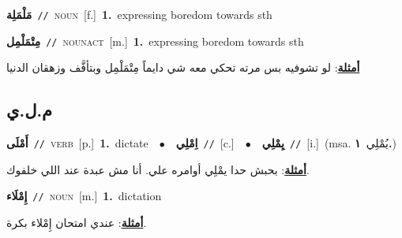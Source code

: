 \documentclass[10pt,a4paper,twoside]{article} %
\begin{document}
\begin{multicols}{2}
{\setlength\topsep{0pt}\textbf{\foreignlanguage{arabic}{مَلْمَلِة}}\ {\color{gray}\texttt{//}\color{black}}\ \textsc{noun}\ [f.]\ \textbf{1.}~expressing boredom towards sth\ } \vspace{2mm}

{\setlength\topsep{0pt}\textbf{\foreignlanguage{arabic}{مِتْمَلْمِل}}\ {\color{gray}\texttt{//}\color{black}}\ \textsc{noun\textunderscore act}\ [m.]\ \textbf{1.}~expressing boredom towards sth\  \begin{flushright}\color{gray}\foreignlanguage{arabic}{\textbf{\underline{\foreignlanguage{arabic}{أمثلة}}}: لو تشوفيه بس مرته تحكي معه شي دايماً مِتْمَلْمِل وبتأفَّف وزهقان الدنيا}\end{flushright}\color{black}} \vspace{2mm}

\vspace{-3mm}
\subsection*{\color{blue}\foreignlanguage{arabic}{م.ل.ي}\color{blue}{}} 

{\setlength\topsep{0pt}\textbf{\foreignlanguage{arabic}{أَمْلَى}}\ {\color{gray}\texttt{//}\color{black}}\ \textsc{verb}\ [p.]\ \textbf{1.}~dictate\ \ $\bullet$\ \ \setlength\topsep{0pt}\textbf{\foreignlanguage{arabic}{اِمْلِي}}\ {\color{gray}\texttt{//}\color{black}}\ [c.]\ \ $\bullet$\ \ \setlength\topsep{0pt}\textbf{\foreignlanguage{arabic}{يِمْلِي}}\ {\color{gray}\texttt{//}\color{black}}\ [i.]\ \color{gray}(msa. \foreignlanguage{arabic}{يُمْلِي}~\foreignlanguage{arabic}{\textbf{١.}})\color{black}\  \begin{flushright}\color{gray}\foreignlanguage{arabic}{\textbf{\underline{\foreignlanguage{arabic}{أمثلة}}}: بحبش حدا يمْلِي أوامره علي. أنا مش عبدة عند اللي خلفوك.}\end{flushright}\color{black}} \vspace{2mm}

{\setlength\topsep{0pt}\textbf{\foreignlanguage{arabic}{إِمْلَاء}}\ {\color{gray}\texttt{//}\color{black}}\ \textsc{noun}\ [m.]\ \textbf{1.}~dictation\  \begin{flushright}\color{gray}\foreignlanguage{arabic}{\textbf{\underline{\foreignlanguage{arabic}{أمثلة}}}: عندي امتحان إِمْلاء بكرة.}\end{flushright}\color{black}} \vspace{2mm}


\end{multicols}
\end{document}
